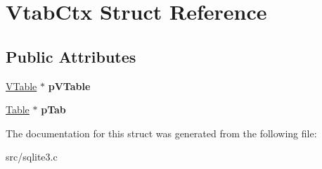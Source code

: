 \hypertarget{struct_vtab_ctx}{\section{Vtab\-Ctx Struct Reference}
\label{struct_vtab_ctx}
}
\subsection*{Public Attributes}
\begin{DoxyCompactItemize}
\item 
\hypertarget{struct_vtab_ctx_a99bbe533ea0423138d7dddba5aa662b8}{\hyperlink{struct_v_table}{V\-Table} $\ast$ {\bfseries p\-V\-Table}}\label{struct_vtab_ctx_a99bbe533ea0423138d7dddba5aa662b8}

\item 
\hypertarget{struct_vtab_ctx_a4040cb18a83afebad0ad7e7f20572b09}{\hyperlink{struct_table}{Table} $\ast$ {\bfseries p\-Tab}}\label{struct_vtab_ctx_a4040cb18a83afebad0ad7e7f20572b09}

\end{DoxyCompactItemize}


The documentation for this struct was generated from the following file\-:\begin{DoxyCompactItemize}
\item 
src/sqlite3.\-c\end{DoxyCompactItemize}
